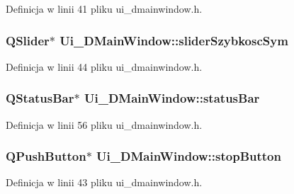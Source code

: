 Definicja w linii 41 pliku ui\+\_\+dmainwindow.\+h.

\hypertarget{class_ui___d_main_window_a8d12f07935a52a597e57eddf50e5c98f}{}
\subsubsection[{slider\+Szybkosc\+Sym}]{\setlength{\rightskip}{0pt plus 5cm}Q\+Slider$\ast$ Ui\+\_\+\+D\+Main\+Window\+::slider\+Szybkosc\+Sym}\label{class_ui___d_main_window_a8d12f07935a52a597e57eddf50e5c98f}


Definicja w linii 44 pliku ui\+\_\+dmainwindow.\+h.

\hypertarget{class_ui___d_main_window_ac9e025e7279839dd7ab1686456d1ae21}{}
\subsubsection[{status\+Bar}]{\setlength{\rightskip}{0pt plus 5cm}Q\+Status\+Bar$\ast$ Ui\+\_\+\+D\+Main\+Window\+::status\+Bar}\label{class_ui___d_main_window_ac9e025e7279839dd7ab1686456d1ae21}


Definicja w linii 56 pliku ui\+\_\+dmainwindow.\+h.

\hypertarget{class_ui___d_main_window_a1fe7797fff349a0f0d47d90c8438f386}{}
\subsubsection[{stop\+Button}]{\setlength{\rightskip}{0pt plus 5cm}Q\+Push\+Button$\ast$ Ui\+\_\+\+D\+Main\+Window\+::stop\+Button}\label{class_ui___d_main_window_a1fe7797fff349a0f0d47d90c8438f386}


Definicja w linii 43 pliku ui\+\_\+dmainwindow.\+h.

\hypertarget{class_ui___d_main_window_abba1dae1dd835c7a7dd39da623cd4580}{}
